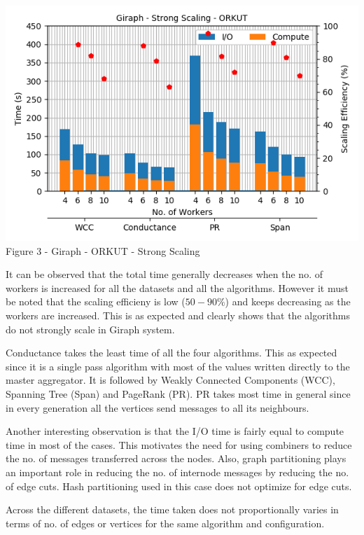 \documentclass[11pt,a4paper,oneside]{article}
\begin{document}
    \begin{center}
    	\includegraphics[scale=0.5]{3.png} \\
    	Figure 3 - Giraph - ORKUT - Strong Scaling		
    \end{center}

    
    \pagebreak

    It can be observed that the total time generally decreases when the no. of workers is increased for all the datasets and all the algorithms. However it must be noted that the scaling efficieny is low ($50 -90 \%$) and keeps decreasing as the workers are increased. This is as expected and clearly shows that the algorithms do not strongly scale in Giraph system.
    
    Conductance takes the least time of all the four algorithms. This as expected since it is a single pass algorithm with most of the values written directly to the master aggregator. It is followed by Weakly Connected Components (WCC), Spanning Tree (Span) and PageRank (PR). PR takes most time in general since in every generation all the vertices send messages to all its neighbours. 
    
    Another interesting observation is that the I/O time is fairly equal to compute time in most of the cases. This motivates the need for using combiners to reduce the no. of messages transferred across the nodes. Also, graph partitioning plays an important role in reducing the no. of internode messages by reducing the no. of edge cuts. Hash partitioning used in this case does not optimize for edge cuts.
    
    Across the different datasets, the time taken does not proportionally varies in terms of no. of edges or vertices for the same algorithm and configuration. 
    
\end{document}
